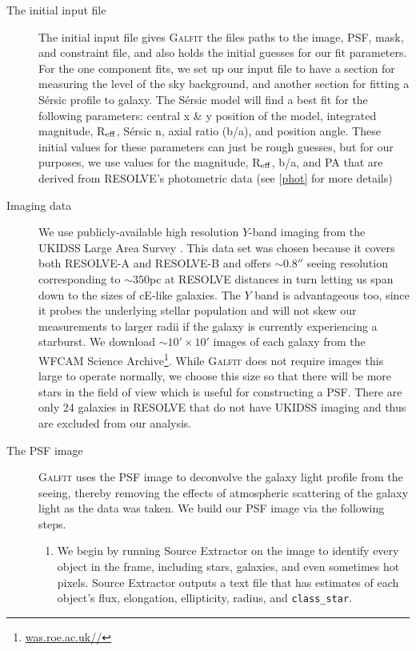 \documentclass[iop,apj]{emulateapj}
\newcommand{\Reff}{R$_{\rm eff}$}
\begin{document}
\begin{description}

\item[The initial input file]{The initial input file gives \textsc{Galfit} the files paths to the image, PSF, mask, and constraint file, and also holds the initial guesses for our fit parameters. For the one component fits, we set up our input file to have a section for measuring the level of the sky background, and another section for fitting a S\'ersic profile to galaxy. The S\'ersic model will find a best fit for the following parameters: central x \& y position of the model, integrated magnitude, \Reff, S\'ersic n, axial ratio (b/a), and position angle. These initial values for these parameters can just be rough guesses, but for our purposes, we use values for the magnitude, \Reff, b/a, and PA that are derived from RESOLVE's photometric data (see \autoref{phot} for more details)}

\item[Imaging data]{We use publicly-available high resolution $Y$-band imaging from the UKIDSS Large Area Survey \citep{Lawrence2007}. This data set was chosen because it covers both RESOLVE-A and RESOLVE-B and offers $\sim0.8''$ seeing resolution corresponding to $\sim350$pc at RESOLVE distances in turn letting us span down to the sizes of cE-like galaxies. The $Y$ band is advantageous too, since it probes the underlying stellar population and will not skew our measurements to larger radii if the galaxy is currently experiencing a starburst. We download $\sim10'\times10'$ images of each galaxy from the WFCAM Science Archive\footnote{\url{was.roe.ac.uk//}}}. While \textsc{Galfit} does not require images this large to operate normally, we choose this size so that there will be more stars in the field of view which is useful for constructing a PSF. There are only 24 galaxies in RESOLVE that do not have UKIDSS imaging and thus are excluded from our analysis.

\item[The PSF image]{\textsc{Galfit} uses the PSF image to deconvolve the galaxy light profile from the seeing, thereby removing the effects of atmospheric scattering of the galaxy light as the data was taken. We build our PSF image via the following steps.
\begin{enumerate}

\item We begin by running Source Extractor on the image to identify every object in the frame, including stars, galaxies, and even sometimes hot pixels. Source Extractor outputs a text file that has estimates of each object's flux, elongation, ellipticity, radius, and \texttt{class\_star}.


\end{enumerate}}
\end{description}
\end{document}
